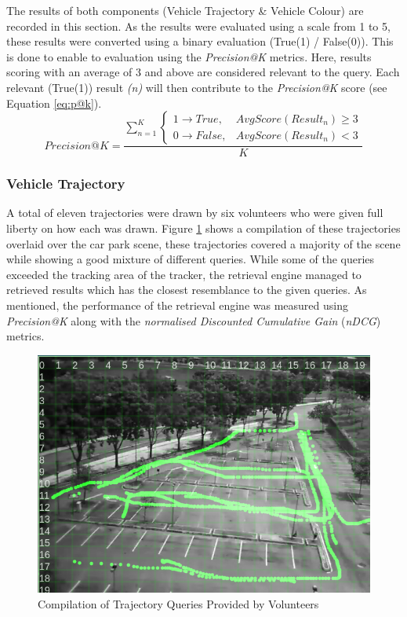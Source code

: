 The results of both components (Vehicle Trajectory \& Vehicle Colour) are recorded in this section. As the results were evaluated using a scale from 1 to 5, these results were converted using a binary evaluation (True(1) / False(0)). This is done to enable to evaluation using the \textit{Precision@K} metrics. Here, results scoring with an average of 3 and above are considered relevant to the query. Each relevant (True(1)) result \textit{(n)} will then contribute to the \textit{Precision@K} score (see Equation \ref{eq:p@k}).
 \begin{equation}
\label{eq:p@k}
Precision@K =  \frac{\sum_{n=1}^K \begin{cases}1 \rightarrow True, & AvgScore(Result_n)\geq 3\\0 \rightarrow False, & AvgScore(Result_n)< 3 \end{cases}} {K}
\end{equation}

\subsubsection{Vehicle Trajectory}
A total of eleven trajectories were drawn by six volunteers who were given full liberty on how each was drawn. Figure \ref{fig:versionTwoTrajquery} shows a compilation of these trajectories overlaid over the car park scene, these trajectories covered a majority of the scene while showing a good mixture of different queries.
While some of the queries exceeded the tracking area of the tracker, the retrieval engine managed to retrieved results which has the closest resemblance to the given queries. As mentioned, the performance of the retrieval engine was measured using \textit{Precision@K} along with the \textit{normalised Discounted Cumulative Gain} (\textit{nDCG}) metrics.

\begin{figure}[!t]
  \centering
    \includegraphics[width=0.8\linewidth]{image/retrievalTwo/trajquery.png}
  \caption{Compilation of Trajectory Queries Provided by Volunteers}
  \label{fig:versionTwoTrajquery}
\end{figure}

